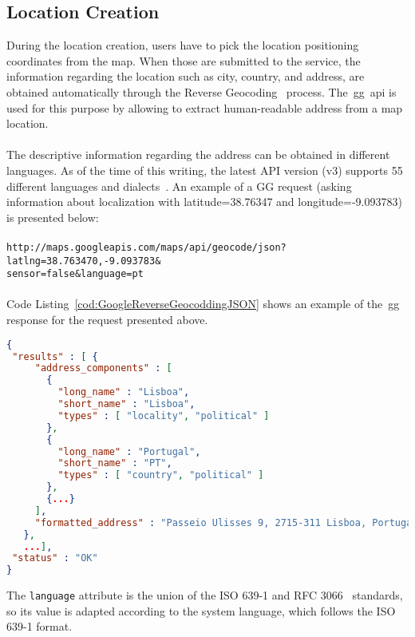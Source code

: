 \subsection{Location Creation}
\label{subsec:locationCreation}
During the location creation, users have to pick the location positioning coordinates from the map. When those are submitted to the service, the information regarding the location such as city, country, and address, are obtained automatically through the Reverse Geocoding~\cite{googleGeocodingAPI} process. The~\gls{gg}~\gls{api} is used for this purpose by allowing to extract human-readable address from a map location.\\
\\
The descriptive information regarding the address can be obtained in different languages. As of the time of this writing, the latest API version (v3) supports 55 different languages and dialects~\cite{googleGeocodingLanguages}. An example of a GG request (asking information about localization with latitude=38.76347 and longitude=-9.093783) is presented below:\\
\\
\verb"http://maps.googleapis.com/maps/api/geocode/json?latlng=38.763470,-9.093783&"\\
\verb"sensor=false&language=pt"\\
\\
Code Listing~\ref{cod:GoogleReverseGeocoddingJSON} shows an example of the~\gls{gg} response for the request presented above.
\begin{lstlisting}[language=json,firstnumber=1,caption={Google Geocoding JSON response example.},label={cod:GoogleReverseGeocoddingJSON}]
{
 "results" : [ {
     "address_components" : [
       {
         "long_name" : "Lisboa",
         "short_name" : "Lisboa",
         "types" : [ "locality", "political" ]
       },
       {
         "long_name" : "Portugal",
         "short_name" : "PT",
         "types" : [ "country", "political" ]
       },
       {...}
     ],
     "formatted_address" : "Passeio Ulisses 9, 2715-311 Lisboa, Portugal",
   },
   ...],
 "status" : "OK"
}
\end{lstlisting}
The \verb"language" attribute is the union of the ISO 639-1 and RFC 3066~\cite{rfc3066} standards, so its value is adapted according to the system language, which follows the ISO 639-1 format.
